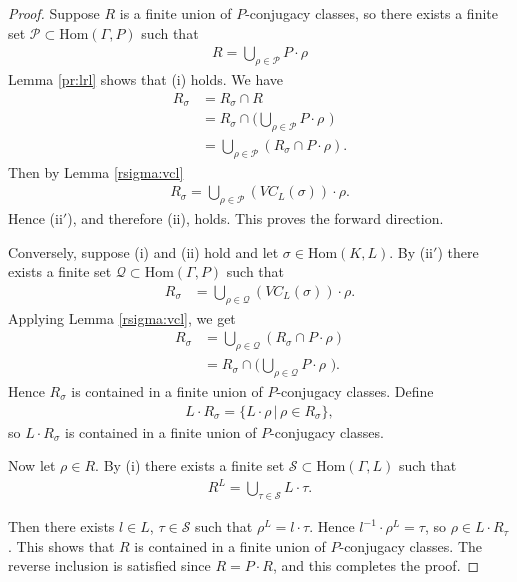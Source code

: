 \begin{proof}
Suppose $R$ is a finite union of $P$-conjugacy classes, so there exists a finite set $\mathcal{P} \subset \mathrm{Hom}(\Gamma, P)$ such that
\begin{align*} R = \bigcup_{\rho \in \mathcal{P}} P \cdot \rho \end{align*}
Lemma \ref{pr:lrl} shows that (i) holds. We have
\begin{align*} R_\sigma &= R_\sigma \cap R \\
&= R_\sigma \cap \big( \bigcup_{\rho \in \mathcal{P}} P \cdot \rho \,\,\big) \\
&= \bigcup_{\rho \in \mathcal{P}} \left( R_\sigma \cap P \cdot \rho \right).
\end{align*}
Then by Lemma \ref{rsigma:vcl}
\begin{align*} R_\sigma = \bigcup_{\rho \in \mathcal{P}} (VC_L(\sigma)) \cdot \rho. \end{align*}
Hence (ii$'$), and therefore (ii), holds. This proves the forward direction.


Conversely, suppose (i) and (ii) hold and let $\sigma \in \mathrm{Hom}(K, L)$. By (ii$'$) there exists a finite set $\mathcal{Q} \subset \mathrm{Hom}(\Gamma, P)$ such that
\begin{align*}
	R_\sigma &= \bigcup_{\rho \in \mathcal{Q}} (VC_L(\sigma)) \cdot \rho.
\end{align*}
Applying Lemma \ref{rsigma:vcl}, we get
\begin{align*}
	R_\sigma &= \bigcup_{\rho \in \mathcal{Q}} \left( R_\sigma \cap P \cdot \rho \right) \\
	&= R_\sigma \cap \big( \bigcup_{\rho \in \mathcal{Q}} P \cdot \rho \,\,\big).
\end{align*}
Hence $R_\sigma$ is contained in a finite union of $P$-conjugacy classes.
Define
\begin{align*}
L \cdot R_\sigma = \{L \cdot \rho \,|\, \rho \in R_\sigma\},
\end{align*}
so $L \cdot R_\sigma$ is contained in a finite union of $P$-conjugacy classes.

Now let $\rho \in R$. By (i) there exists a finite set $\mathcal{S} \subset \mathrm{Hom}(\Gamma, L)$ such that
\begin{align*}
R^L = \bigcup_{\tau \in \mathcal{S}} L \cdot \tau.
\end{align*}

Then there exists $l \in L$, $\tau \in \mathcal{S}$ such that $\rho^L = l \cdot \tau$. Hence $l^{-1} \cdot \rho^L = \tau$, so $\rho \in L \cdot R_\tau$. This shows that $R$ is contained in a finite union of $P$-conjugacy classes. The reverse inclusion is satisfied since $R = P \cdot R$, and this completes the proof.
\end{proof}

